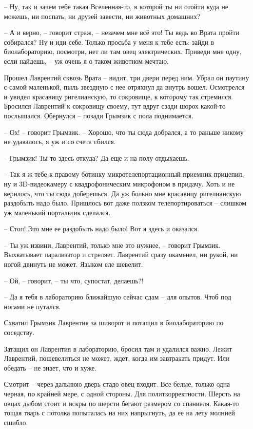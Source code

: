 \documentclass[ebook,oneside,final,openright]{memoir}
\begin{document}
– Ну, так и зачем тебе такая Вселенная-то, в которой ты ни отойти куда не можешь, ни поспать, ни друзей завести, ни животных домашних? \par
– А и верно, – говорит страж, – незачем мне всё это! Ты ведь во Врата пройти собирался? Ну и иди себе. Только просьба у меня к тебе есть: зайди в биолабораторию, посмотри, нет ли там овец электрических. Приведи мне одну, если найдешь, – уж очень я о таком животном мечтаю.\par
\par
\par
Прошел Лаврентий сквозь Врата – видит, три двери перед ним. Убрал он паутину с самой маленькой, пыль звездную с нее отряхнул да внутрь вошел. Осмотрелся и увидел красавицу ригелианскую, то сокровище, к которому так стремился. Бросился Лаврентий к сокровищу своему, тут вдруг сзади шорох какой-то послышался. Обернулся – позади Грымзик с пола поднимается.\par
– Ох! – говорит Грымзик. – Хорошо, что ты сюда добрался, а то раньше никому не удавалось, я уж и со счета сбился.\par
– Грымзик! Ты-то здесь откуда? Да еще и на полу отдыхаешь.\par
– Так я ж тебе к правому ботинку микротелепортационный приемник прицепил, ну и 3D-видеокамеру с квадрофоническим микрофоном в придачу. Хоть и не верилось, что ты сюда доберешься. Да уж больно мне красавицу ригелианскую раздобыть надо было. Пришлось вот даже ползком телепортироваться – слишком уж маленький портальчик сделался.\par
– Стоп! Это мне ее раздобыть надо было! Вот я здесь и оказался.\par
– Ты уж извини, Лаврентий, только мне это нужнее, – говорит Грымзик. Выхватывает парализатор и стреляет. Лаврентий сразу окаменел, ни рукой, ни ногой двинуть не может. Языком еле шевелит.\par
– Ой, – говорит, – ты что, супостат, делаешь?!\par
– Да я тебя в лабораторию ближайшую сейчас сдам – для опытов. Чтоб под ногами не путался.\par
Схватил Грымзик Лаврентия за шиворот и потащил в биолабораторию по соседству.\par
\par
Затащил он Лаврентия в лабораторию, бросил там и удалился важно. Лежит Лаврентий, пошевелиться не может, ждет, когда им завтракать придут. Или обедать – не знает, что и хуже. \par
Смотрит – через дальнюю дверь стадо овец входит. Все белые, только одна черная, по крайней мере, с одной стороны. Для политкорректности. Шерсть на овцах дыбом стоит и искры по шерсти бегают размером со спаниеля. Какая-то тощая тварь с потолка попыталась на них напрыгнуть, да ее на лету молнией сшибло.\par
\end{document}
